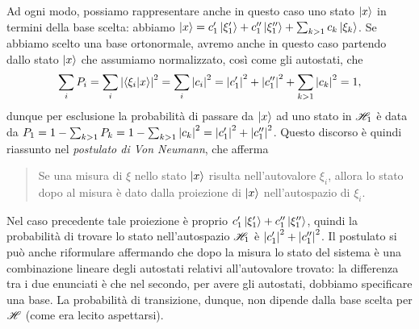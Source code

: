 Ad ogni modo, possiamo rappresentare anche in questo caso uno stato $\left|{x}\right\rangle$ in termini della base scelta: abbiamo $\left|{x}\right\rangle=c_1'\left|{\xi_1'}\right\rangle+c_1''\left|{\xi_1''}\right\rangle+\sum_{k>1}c_k\left|{\xi_k}\right\rangle$.
Se abbiamo scelto una base ortonormale, avremo anche in questo caso partendo dallo stato $\left|{x}\right\rangle$ che assumiamo normalizzato, cos\`i come gli autostati, che
\begin{equation}
	\sum_iP_i=\sum_i\left|{\left\langle{\xi_i}\middle|{x}\right\rangle}\right|^2=\sum_i\left|{c_i}\right|^2=\left|{c_1'}\right|^2+\left|{c_1''}\right|^2+\sum_{k>1}\left|{c_k}\right|^2=1,
\end{equation}
dunque per esclusione la probabilità di passare da $\left|{x}\right\rangle$ ad uno stato in $\mathscr H_1$ è data da $P_1=1-\sum_{k>1}P_k=1-\sum_{k>1}\left|{c_k}\right|^2=\left|{c_1'}\right|^2+\left|{c_1''}\right|^2$.
Questo discorso è quindi riassunto nel \emph{postulato di Von Neumann}, che afferma
\begin{quote}
	Se una misura di $\xi$ nello stato $\left|{x}\right\rangle$ risulta nell'autovalore $\xi_i$, allora lo stato dopo al misura è dato dalla proiezione di $\left|{x}\right\rangle$ nell'autospazio di $\xi_i$.
\end{quote}
Nel caso precedente tale proiezione è proprio $c_1'\left|{\xi_1'}\right\rangle+c_1''\left|{\xi_1''}\right\rangle$, quindi la probabilità di trovare lo stato nell'autospazio $\mathscr H_1$ è $\left|{c_1'}\right|^2+\left|{c_1''}\right|^2$.
Il postulato si può anche riformulare affermando che dopo la misura lo stato del sistema è una combinazione lineare degli autostati relativi all'autovalore trovato: la differenza tra i due enunciati è che nel secondo, per avere gli autostati, dobbiamo specificare una base.
La probabilità di transizione, dunque, non dipende dalla base scelta per $\mathscr H$ (come era lecito aspettarsi).

